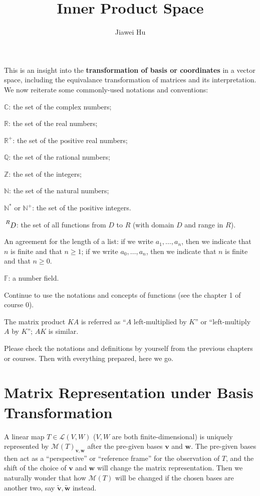 \documentclass{article}
\title{\LARGE \textbf{Inner Product Space}}
\author{\large Jiawei Hu}
\newcommand{\basisTilde}[1]{\tilde{\pmb{#1}}}
\begin{document}
\maketitle

This is an insight into the \textbf{transformation of basis or coordinates} in a vector space, including the equivalance transformation of matrices and its interpretation.
We now reiterate some commonly-used notations and conventions:
\begin{compactenum}
    \item $\mathbb{C}$: the set of the complex numbers;
    \item $\mathbb{R}$: the set of the real numbers;
    \item $\mathbb{R}^+$: the set of the positive real numbers;
    \item $\mathbb{Q}$: the set of the rational numbers;
    \item $\mathbb{Z}$: the set of the integers;
    \item $\mathbb{N}$: the set of the natural numbers;
    \item $\mathbb{N^\ast}$ or $\mathbb{N}^+$: the set of the positive integers.
    \item $\sideset{^R}{}{\mathop{D}}$: the set of all functions from $D$ to $R$ (with domain $D$ and range in $R$).
    \item An agreement for the length of a list: if we write $a_1, \dots, a_n$, then we indicate that $n$ is finite and that $n\geq 1$; if we write $a_0, \dots, a_n$, then we indicate that $n$ is finite and that $n\geq 0$.
    \item $\mathbb{F}$: a number field.
    \item Continue to use the notations and concepts of functions (see the chapter 1 of course 0).
    \item The matrix product $KA$ is referred as ``$A$ left-multiplied by $K$'' or ``left-multiply $A$ by $K$''; $AK$ is similar.
\end{compactenum} 
Please check the notations and definitions by yourself from the previous chapters or courses. Then with everything prepared, here we go.

\section{Matrix Representation under Basis Transformation}
A linear map $T\in\mathcal{L}(V,W)$ ($V, W$ are both finite-dimensional) is uniquely represented by $\mathcal{M}(T)_{\pmb{v}, \pmb{w}}$ after the pre-given bases $\pmb{v}$ and $\pmb{w}$. The pre-given bases then act as a ``perspective'' or ``reference frame'' for the observation of $T$, and the shift of the choice of $\pmb{v}$ and $\pmb{w}$ will change the matrix representation. Then we naturally wonder that how $\mathcal{M}(T)$ will be changed if the chosen bases are another two, say $\basisTilde{v}, \basisTilde{w}$ instead.
\end{document}
